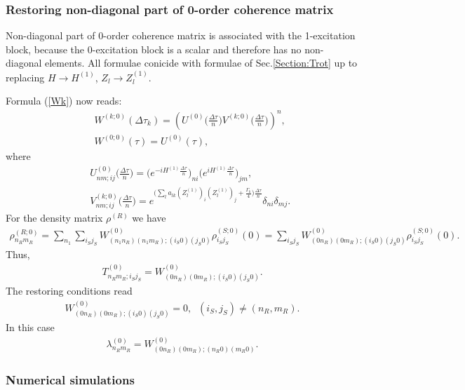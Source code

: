 \documentclass[pra,preprint,showpacs]{revtex4-1}
\begin{document}
{\subsubsection{Restoring non-diagonal part of 0-order coherence matrix}

Non-diagonal part of 0-order coherence matrix is associated with the 1-excitation block, because the 0-excitation block is a scalar and therefore has no non-diagonal elements.
All formulae conicide with formulae of Sec.\ref{Section:Trot} up to replacing $H\to H^{(1)}$, $Z_l\to Z^{(1)}_l$.

Formula (\ref{Wk}) now reads:
\begin{eqnarray}\label{Wk0}
&&
W^{(k;0)}(\Delta\tau_k) =
\left(U^{(0)}\Big(\frac{\Delta \tau}{n}\Big) V^{(k;0)}\Big(\frac{\Delta \tau}{n}\Big)\right)^n ,\\\nonumber
&&
W^{(0;0)}(\tau) =U^{(0)}(\tau),
\end{eqnarray}
where
\begin{eqnarray}\label{UV0}
&&
U^{(0)}_{nm;ij}\Big(\frac{\Delta \tau}{n}\Big) = \Big(e^{ -i H^{(1)}\frac{\Delta \tau}{n}} \Big)_{ni}\Big(e^{ i H^{(1)}\frac{\Delta \tau}{n}} \Big)_{jm}  ,\\\nonumber
&&
V^{(k;0)}_{nm;ij}\Big(\frac{\Delta \tau}{n}\Big) = e^{ \Big( \sum_l a_{lk} (Z^{(1)}_l )_i  (Z^{(1)}_l)_{j}  +\frac{\Gamma_k}{4}\Big)    \frac{\Delta \tau}{n}} \delta_{ni}\delta_{mj}.
\end{eqnarray}
For the density matrix $\rho^{(R)}$ we have
\begin{eqnarray}
\rho^{(R;0)}_{n_Rm_R} =\sum_{n_1} \sum_{i_Sj_S}W^{(0)}_{(n_1 n_R)(n_1m_R);(i_S0)(j_S0)} \rho^{(S;0)}_{i_Sj_S}(0) =\sum_{i_Sj_S}W^{(0)}_{(0 n_R)(0m_R);(i_S0)(j_S0)}  \rho^{(S;0)}_{i_Sj_S}(0) .
\end{eqnarray}
Thus,
\begin{eqnarray}
T^{(0)}_{n_Rm_R;i_Sj_S} = W^{(0)}_{(0 n_R)(0m_R);(i_S0)(j_S0)} .
\end{eqnarray}
The restoring conditions read
\begin{eqnarray}\label{restoring}
W^{(0)}_{(0 n_R)(0m_R);(i_S0)(j_S0)}=0, \;\;(i_S,j_S)\neq (n_R,m_R) .
\end{eqnarray}
In this case
\begin{eqnarray}\label{lambda}
\lambda^{(0)}_{n_Rm_R} =W^{(0)}_{(0 n_R)(0m_R);(n_R0)(m_R0)}.
\end{eqnarray}

\subsubsection{Numerical simulations}

}
\end{document}
